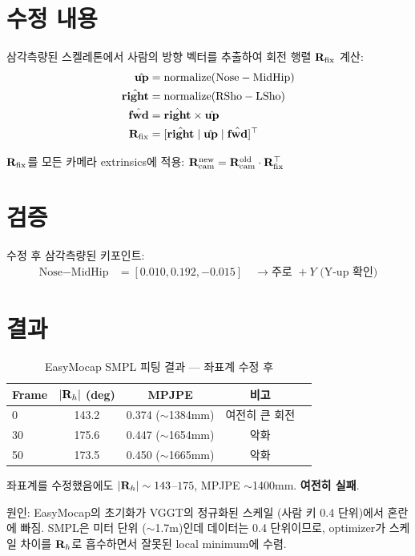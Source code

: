 \documentclass[11pt, a4paper]{report}
\begin{document}
\section{수정 내용}

삼각측량된 스켈레톤에서 사람의 방향 벡터를 추출하여 회전 행렬 $\mathbf{R}_\text{fix}$ 계산:
\begin{align}
\hat{\mathbf{up}} &= \text{normalize}(\text{Nose} - \text{MidHip}) \\
\hat{\mathbf{right}} &= \text{normalize}(\text{RSho} - \text{LSho}) \\
\hat{\mathbf{fwd}} &= \hat{\mathbf{right}} \times \hat{\mathbf{up}} \\
\mathbf{R}_\text{fix} &= [\hat{\mathbf{right}} \mid \hat{\mathbf{up}} \mid \hat{\mathbf{fwd}}]^\top
\end{align}

$\mathbf{R}_\text{fix}$를 모든 카메라 extrinsics에 적용: $\mathbf{R}_\text{cam}^\text{new} = \mathbf{R}_\text{cam}^\text{old} \cdot \mathbf{R}_\text{fix}^\top$

\section{검증}
수정 후 삼각측량된 키포인트:
\begin{align*}
\text{Nose} - \text{MidHip} &= [0.010, 0.192, -0.015] \quad \rightarrow \text{주로 } +Y \text{ (Y-up 확인)}
\end{align*}

\section{결과}

\begin{table}[H]
\centering
\caption{EasyMocap SMPL 피팅 결과 --- 좌표계 수정 후}
\renewcommand{\arraystretch}{1.3}
\begin{tabular}{l cccc}
\toprule
\textbf{Frame} & $|\mathbf{R}_h|$ (deg) & MPJPE & 비고 \\
\midrule
0 & 143.2 & 0.374 ($\sim$1384mm) & 여전히 큰 회전 \\
30 & 175.6 & 0.447 ($\sim$1654mm) & 악화 \\
50 & 173.5 & 0.450 ($\sim$1665mm) & 악화 \\
\bottomrule
\end{tabular}
\end{table}

\begin{warningbox}
좌표계를 수정했음에도 $|\mathbf{R}_h| \sim 143$--$175$\textdegree, MPJPE $\sim$1400mm. \textcolor{hard}{\textbf{여전히 실패}}.

원인: EasyMocap의 초기화가 VGGT의 정규화된 스케일 (사람 키 0.4 단위)에서 혼란에 빠짐. SMPL은 미터 단위 ($\sim$1.7m)인데 데이터는 0.4 단위이므로, optimizer가 스케일 차이를 $\mathbf{R}_h$로 흡수하면서 잘못된 local minimum에 수렴.
\end{warningbox}
\end{document}
